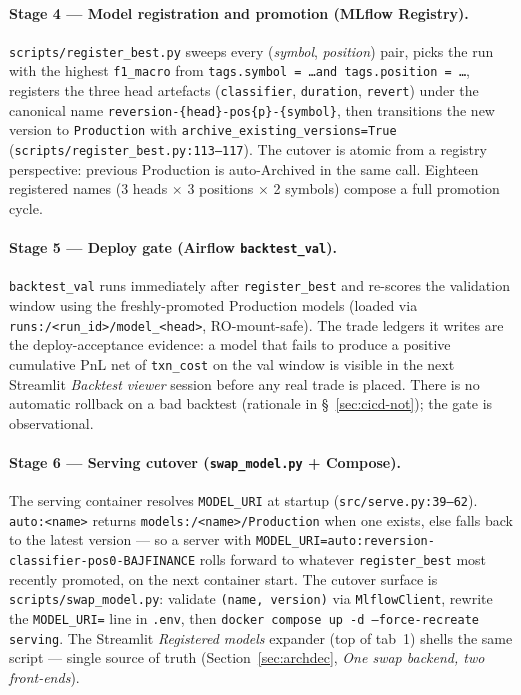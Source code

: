\documentclass[11pt,a4paper]{article}
\begin{document}
\paragraph{Stage 4 --- Model registration and promotion (MLflow Registry).}
\texttt{scripts/register\_best.py} sweeps every (\emph{symbol}, \emph{position}) pair, picks the run with the highest \texttt{f1\_macro} from \texttt{tags.symbol = \dots and tags.position = \dots}, registers the three head artefacts (\texttt{classifier}, \texttt{duration}, \texttt{revert}) under the canonical name \texttt{reversion-\{head\}-pos\{p\}-\{symbol\}}, then transitions the new version to \texttt{Production} with \texttt{archive\_existing\_versions=True} (\texttt{scripts/register\_best.py:113--117}). The cutover is atomic from a registry perspective: previous Production is auto-Archived in the same call. Eighteen registered names (3 heads $\times$ 3 positions $\times$ 2 symbols) compose a full promotion cycle.

\paragraph{Stage 5 --- Deploy gate (Airflow \texttt{backtest\_val}).}
\texttt{backtest\_val} runs immediately after \texttt{register\_best} and re-scores the validation window using the freshly-promoted Production models (loaded via \texttt{runs:/<run\_id>/model\_<head>}, RO-mount-safe). The trade ledgers it writes are the deploy-acceptance evidence: a model that fails to produce a positive cumulative PnL net of \texttt{txn\_cost} on the val window is visible in the next Streamlit \emph{Backtest viewer} session before any real trade is placed. There is no automatic rollback on a bad backtest (rationale in \S~\ref{sec:cicd-not}); the gate is observational.

\paragraph{Stage 6 --- Serving cutover (\texttt{swap\_model.py} + Compose).}
The serving container resolves \texttt{MODEL\_URI} at startup (\texttt{src/serve.py:39--62}). \texttt{auto:<name>} returns \texttt{models:/<name>/Production} when one exists, else falls back to the latest version --- so a server with \texttt{MODEL\_URI=auto:reversion-classifier-pos0-BAJFINANCE} rolls forward to whatever \texttt{register\_best} most recently promoted, on the next container start. The cutover surface is \texttt{scripts/swap\_model.py}: validate \texttt{(name, version)} via \texttt{MlflowClient}, rewrite the \texttt{MODEL\_URI=} line in \texttt{.env}, then \texttt{docker compose up -d --force-recreate serving}. The Streamlit \emph{Registered models} expander (top of tab~1) shells the same script --- single source of truth (Section~\ref{sec:archdec}, \emph{One swap backend, two front-ends}).
\end{document}
